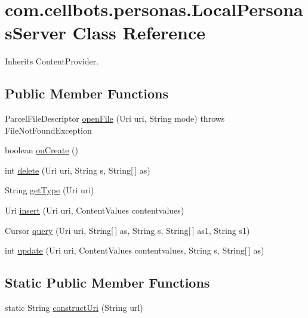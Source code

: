 \hypertarget{classcom_1_1cellbots_1_1personas_1_1_local_personas_server}{\section{com.\-cellbots.\-personas.\-Local\-Personas\-Server Class Reference}
\label{classcom_1_1cellbots_1_1personas_1_1_local_personas_server}
}


Inherits Content\-Provider.

\subsection*{Public Member Functions}
\begin{DoxyCompactItemize}
\item 
Parcel\-File\-Descriptor \hyperlink{classcom_1_1cellbots_1_1personas_1_1_local_personas_server_a8d8f4158d6904db8d65cc730871d2ef1}{open\-File} (Uri uri, String mode)  throws File\-Not\-Found\-Exception 
\item 
boolean \hyperlink{classcom_1_1cellbots_1_1personas_1_1_local_personas_server_adc890239f90b239b97ce185de2c942db}{on\-Create} ()
\item 
int \hyperlink{classcom_1_1cellbots_1_1personas_1_1_local_personas_server_aaeeeff0b517f086030825b59bb6333e8}{delete} (Uri uri, String s, String\mbox{[}$\,$\mbox{]} as)
\item 
String \hyperlink{classcom_1_1cellbots_1_1personas_1_1_local_personas_server_adc23c80bd2ac08d1d82790f511b66660}{get\-Type} (Uri uri)
\item 
Uri \hyperlink{classcom_1_1cellbots_1_1personas_1_1_local_personas_server_aed58ebe507a334857d99f129a04d84b4}{insert} (Uri uri, Content\-Values contentvalues)
\item 
Cursor \hyperlink{classcom_1_1cellbots_1_1personas_1_1_local_personas_server_aa8ec8a9cbc503521788b91e996a9229a}{query} (Uri uri, String\mbox{[}$\,$\mbox{]} as, String s, String\mbox{[}$\,$\mbox{]} as1, String s1)
\item 
int \hyperlink{classcom_1_1cellbots_1_1personas_1_1_local_personas_server_a136f6c8628a8b7962a8c25d680868f1d}{update} (Uri uri, Content\-Values contentvalues, String s, String\mbox{[}$\,$\mbox{]} as)
\end{DoxyCompactItemize}
\subsection*{Static Public Member Functions}
\begin{DoxyCompactItemize}
\item 
static String \hyperlink{classcom_1_1cellbots_1_1personas_1_1_local_personas_server_acee76b7b04f615d8a25de7a5a5a3dd0c}{construct\-Uri} (String url)
\end{DoxyCompactItemize}


